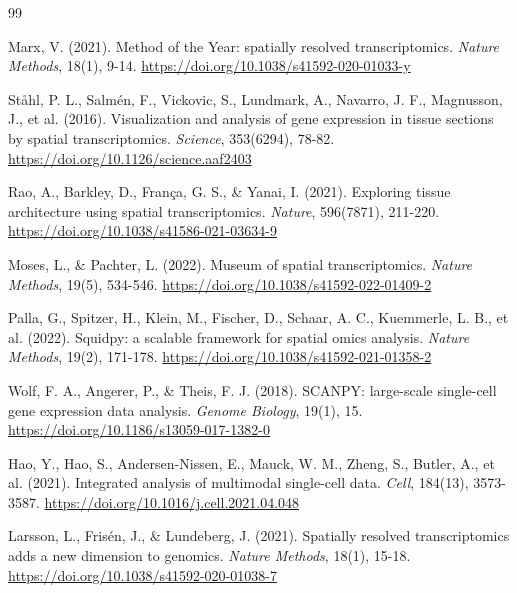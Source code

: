 \documentclass[11pt, a4paper]{article}
\begin{document}
\begin{thebibliography}{99}

 Marx, V. (2021). Method of the Year: spatially resolved transcriptomics. \textit{Nature Methods}, 18(1), 9-14. \href{https://doi.org/10.1038/s41592-020-01033-y}{https://doi.org/10.1038/s41592-020-01033-y}

 Ståhl, P. L., Salmén, F., Vickovic, S., Lundmark, A., Navarro, J. F., Magnusson, J., et al. (2016). Visualization and analysis of gene expression in tissue sections by spatial transcriptomics. \textit{Science}, 353(6294), 78-82. \href{https://doi.org/10.1126/science.aaf2403}{https://doi.org/10.1126/science.aaf2403}

 Rao, A., Barkley, D., França, G. S., \& Yanai, I. (2021). Exploring tissue architecture using spatial transcriptomics. \textit{Nature}, 596(7871), 211-220. \href{https://doi.org/10.1038/s41586-021-03634-9}{https://doi.org/10.1038/s41586-021-03634-9}

 Moses, L., \& Pachter, L. (2022). Museum of spatial transcriptomics. \textit{Nature Methods}, 19(5), 534-546. \href{https://doi.org/10.1038/s41592-022-01409-2}{https://doi.org/10.1038/s41592-022-01409-2}

 Palla, G., Spitzer, H., Klein, M., Fischer, D., Schaar, A. C., Kuemmerle, L. B., et al. (2022). Squidpy: a scalable framework for spatial omics analysis. \textit{Nature Methods}, 19(2), 171-178. \href{https://doi.org/10.1038/s41592-021-01358-2}{https://doi.org/10.1038/s41592-021-01358-2}

 Wolf, F. A., Angerer, P., \& Theis, F. J. (2018). SCANPY: large-scale single-cell gene expression data analysis. \textit{Genome Biology}, 19(1), 15. \href{https://doi.org/10.1186/s13059-017-1382-0}{https://doi.org/10.1186/s13059-017-1382-0}

 Hao, Y., Hao, S., Andersen-Nissen, E., Mauck, W. M., Zheng, S., Butler, A., et al. (2021). Integrated analysis of multimodal single-cell data. \textit{Cell}, 184(13), 3573-3587. \href{https://doi.org/10.1016/j.cell.2021.04.048}{https://doi.org/10.1016/j.cell.2021.04.048}

 Larsson, L., Frisén, J., \& Lundeberg, J. (2021). Spatially resolved transcriptomics adds a new dimension to genomics. \textit{Nature Methods}, 18(1), 15-18. \href{https://doi.org/10.1038/s41592-020-01038-7}{https://doi.org/10.1038/s41592-020-01038-7}


\end{thebibliography}
\end{document}
